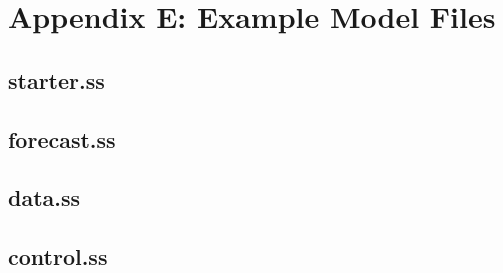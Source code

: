 \section{Appendix E: Example Model Files}

\subsection{starter.ss}

\subsection{forecast.ss}

\subsection{data.ss}

\subsection{control.ss}